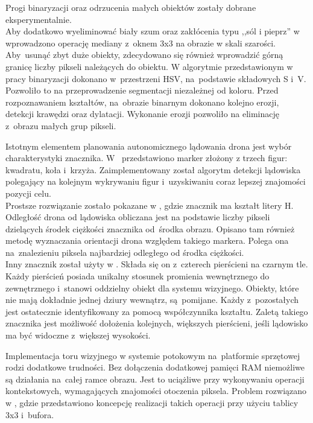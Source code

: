 Progi binaryzacji oraz odrzucenia małych obiektów zostały dobrane eksperymentalnie.\\ 
Aby dodatkowo wyeliminować biały szum oraz zakłócenia typu ,,sól i pieprz'' w \cite{H_median} wprowadzono operację mediany z~oknem 3x3 na obrazie w skali szarości. Aby~usunąć zbyt duże obiekty, zdecydowano się również wprowadzić górną granicę liczby pikseli należących do obiektu. W algorytmie przedstawionym w pracy \cite{FPGA} binaryzacji dokonano w~przestrzeni HSV, na~podstawie składowych S i~V. Pozwoliło to na przeprowadzenie segmentacji niezależnej od koloru. Przed rozpoznawaniem kształtów, na~obrazie binarnym dokonano kolejno erozji, detekcji krawędzi oraz dylatacji. Wykonanie erozji pozwoliło na eliminację z~obrazu małych grup pikseli.\par 
Istotnym elementem planowania autonomicznego lądowania drona jest wybór charakterystyki znacznika. W~\cite{Falanga}  przedstawiono marker złożony z trzech figur: kwadratu, koła i~krzyża. Zaimplementowany został algorytm detekcji lądowiska polegający na kolejnym wykrywaniu figur i~uzyskiwaniu coraz lepszej znajomości pozycji celu.\\
Prostsze rozwiązanie zostało pokazane w \cite{H}, gdzie znacznik ma kształt litery H. Odległość drona od lądowiska obliczana jest na podstawie liczby pikseli dzielących środek ciężkości znacznika od~środka obrazu. Opisano tam również metodę wyznaczania orientacji drona względem takiego markera. Polega ona na~znalezieniu piksela najbardziej odległego od środka ciężkości.\\
Inny znacznik został użyty w \cite{Rings}. Składa się on z~czterech pierścieni na czarnym tle. Każdy pierścień posiada unikalny stosunek promienia wewnętrznego do zewnętrznego i~stanowi oddzielny obiekt dla systemu wizyjnego. Obiekty, które nie mają dokładnie jednej dziury wewnątrz, są~pomijane. Każdy z~pozostałych jest ostatecznie identyfikowany za pomocą współczynnika kształtu. Zaletą takiego znacznika jest możliwość dołożenia kolejnych, większych pierścieni, jeśli lądowisko ma być widoczne z~większej wysokości.\par 
Implementacja toru wizyjnego w systemie potokowym na~platformie sprzętowej rodzi dodatkowe trudności. Bez dołączenia dodatkowej pamięci RAM niemożliwe są działania na~całej ramce obrazu. Jest to uciążliwe przy wykonywaniu operacji kontekstowych, wymagających znajomości otoczenia piksela. Problem rozwiązano w \cite{FPGA}, gdzie przedstawiono koncepcję realizacji takich operacji przy użyciu tablicy 3x3 i~bufora.\par 
